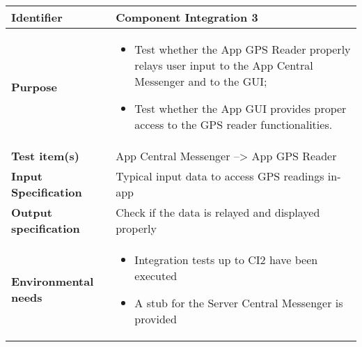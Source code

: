 
\begin{center}
\begin{tabular}{lp{}}
\toprule
\textbf{Identifier}		&	Component Integration 3\\
\midrule
\textbf{Purpose}		&	\begin{itemize}
					\item Test whether the App GPS Reader properly relays user input to the App Central Messenger and to the GUI;
					\item Test whether the App GUI provides proper access to the GPS reader functionalities.
					\end{itemize}	\\
\textbf{Test item(s)}	&	App Central Messenger --> App GPS Reader\\
			
\textbf{Input Specification}	&	Typical input data to access GPS readings in-app\\
\textbf{Output specification}	&	Check if the data is relayed and displayed properly\\
\textbf{Environmental needs}	&	\begin{itemize}
							\item Integration tests up to CI2 have been executed
							\item A stub for the Server Central Messenger is provided
							\end{itemize}	\\
\bottomrule
\end{tabular}
\end{center}


